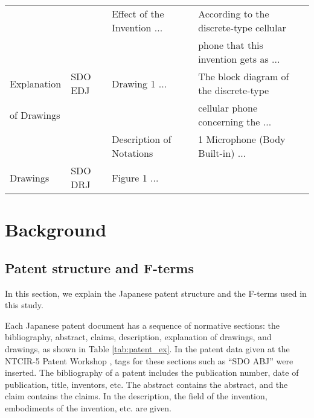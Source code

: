 \documentclass[english]{jnlp_1.2c}
\begin{document}
\begin{table}[b]
\begin{tabular}{|l|l|l|l|}
	&	& Effect of the Invention ... & According to the discrete-type cellular \\
	&	&	& phone that this invention gets as ... \\
\hline
Explanation & SDO EDJ & Drawing 1 ... & The block diagram of the discrete-type \\
of Drawings &	&	& cellular phone concerning the ... \\
	&	& Description of Notations & 1 Microphone (Body Built-in) ... \\
\hline
Drawings & SDO DRJ & Figure 1 ... & \\
\hline
\end{tabular}
\end{table}

\section{Background}
\label{sec:background}


\subsection{Patent structure and F-terms}
\label{sec:patent-exp}

In this section, 
we explain the Japanese patent structure and the F-terms used in this study. 

Each Japanese patent document has a sequence of normative sections:
the bibliography, abstract, 
claims, description,
explanation of drawings, and drawings, as shown in Table \ref{tab:patent_ex}.
In the patent data given at the NTCIR-5 Patent Workshop \cite{Ntcir5_patent_web_2,Ntcir5_patent_2}, 
tags for these sections such as ``SDO ABJ'' were inserted. 
The bibliography of a patent includes
the publication number, date of publication, title, inventors, etc.
The abstract contains the abstract, and
the claim contains the claims. 
In the description, 
the field of the invention, 
embodiments of the invention, etc. are given.
\end{document}

